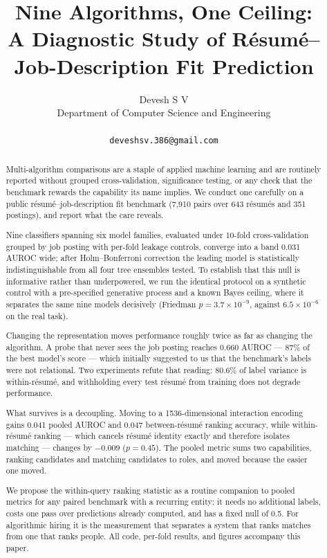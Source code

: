 \documentclass[11pt]{article}                      %
\title{\textbf{Nine Algorithms, One Ceiling:\\
A Diagnostic Study of Résumé--Job-Description Fit Prediction}}
\author{Devesh S V\\
  Department of Computer Science and Engineering\\
  \affiliation\\
  \texttt{deveshsv.386@gmail.com}}
\date{}
\begin{document}
\maketitle

\begin{abstract}
Multi-algorithm comparisons are a staple of applied machine learning and are
routinely reported without grouped cross-validation, significance testing, or any
check that the benchmark rewards the capability its name implies. We conduct one
carefully on a public résumé--job-description fit benchmark (7{,}910 pairs over
643 résumés and 351 postings), and report what the care reveals.

Nine classifiers spanning six model families, evaluated under 10-fold
cross-validation grouped by job posting with per-fold leakage controls, converge
into a band 0.031 AUROC wide; after Holm--Bonferroni correction the leading model
is statistically indistinguishable from all four tree ensembles tested. To
establish that this null is informative rather than underpowered, we run the
identical protocol on a synthetic control with a pre-specified generative process
and a known Bayes ceiling, where it separates the same nine models decisively
(Friedman $p = 3.7 \times 10^{-9}$, against $6.5 \times 10^{-6}$ on the real
task).

Changing the representation moves performance roughly twice as far as changing
the algorithm. A probe that never sees the job posting reaches 0.660 AUROC ---
87\% of the best model's score --- which initially suggested to us that the
benchmark's labels were not relational. Two experiments refute that reading:
80.6\% of label variance is within-résumé, and withholding every test résumé from
training does not degrade performance.

What survives is a decoupling. Moving to a 1536-dimensional interaction encoding
gains 0.041 pooled AUROC and 0.047 between-résumé ranking accuracy, while
within-résumé ranking --- which cancels résumé identity exactly and therefore
isolates matching --- changes by $-0.009$ ($p = 0.45$). The pooled metric sums two
capabilities, ranking candidates and matching candidates to roles, and moved
because the easier one moved.

We propose the within-query ranking statistic as a routine companion to pooled
metrics for any paired benchmark with a recurring entity: it needs no additional
labels, costs one pass over predictions already computed, and has a fixed null of
0.5. For algorithmic hiring it is the measurement that separates a system that
ranks matches from one that ranks people. All code, per-fold results, and figures
accompany this paper.
\end{abstract}
\end{document}
